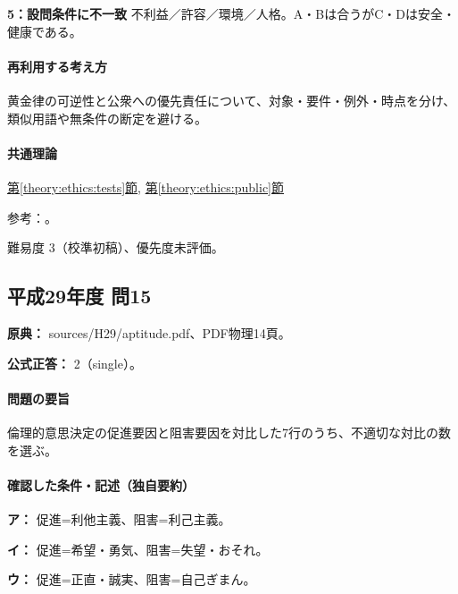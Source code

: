 \noindent\textbf{5：設問条件に不一致} 不利益／許容／環境／人格。A・Bは合うがC・Dは安全・健康である。\par

\paragraph{再利用する考え方} 黄金律の可逆性と公衆への優先責任について、対象・要件・例外・時点を分け、類似用語や無条件の断定を避ける。

\paragraph{共通理論} \hyperref[theory:ethics:tests]{第\ref*{theory:ethics:tests}節}, \hyperref[theory:ethics:public]{第\ref*{theory:ethics:public}節}

\par 参考：\cite{davis_seven_steps,ipej_ethics2011}。

\par 難易度 3（校準初稿）、優先度未評価。

\subsection{平成29年度 問15}
\label{q:h29-reg-apt-15}

\noindent\textbf{原典：} sources/H29/aptitude.pdf、PDF物理14頁。

\textbf{公式正答：} 2（single）。

\paragraph{問題の要旨} 倫理的意思決定の促進要因と阻害要因を対比した7行のうち、不適切な対比の数を選ぶ。

\paragraph{確認した条件・記述（独自要約）}\mbox{}\par

\noindent\textbf{ア：} 促進=利他主義、阻害=利己主義。\par

\noindent\textbf{イ：} 促進=希望・勇気、阻害=失望・おそれ。\par

\noindent\textbf{ウ：} 促進=正直・誠実、阻害=自己ぎまん。\par

